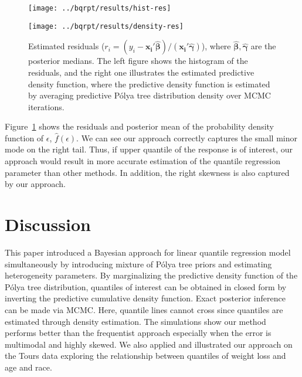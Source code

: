 \documentclass[12pt]{article}
\newcommand{\polya}{P\'{o}lya}
\begin{document}
\begin{figure}[htbp]
  \begin{minipage}{0.5\linewidth}
    \centerline{\texttt{[image: ../bqrpt/results/hist-res]}}
  \end{minipage}
  \begin{minipage}{0.5\linewidth}
    \centerline{\texttt{[image: ../bqrpt/results/density-res]}}
  \end{minipage}
  \caption[]{\label{fig:tourpost} Estimated residuals ($r_i = (y_i-
    \bm{x_i'\hat{\beta}})/(\bm{x_i'\hat{\gamma}})$), where
    $\hat{\bm{\beta}}, \hat{\bm{\gamma}}$ are the posterior
    medians. The left figure shows the histogram of the residuals, and
    the right one illustrates the estimated predictive density
    function, where the predictive density function is estimated by
    averaging predictive \polya{} tree distribution density over MCMC
    iterations.}
\end{figure}

Figure~\ref{fig:tourpost} shows the residuals and posterior mean of
the probability density function of $\epsilon$,
$\hat{f}(\epsilon)$. We can see our approach correctly captures the
small minor mode on the right tail. Thus, if upper quantile of the
response is of interest, our approach would result in more accurate
estimation of the quantile regression parameter than other methods. In
addition, the right skewness is also captured by our approach.

\section{Discussion}
This paper introduced a Bayesian approach for linear quantile
regression model simultaneously by introducing mixture of \polya{}
tree priors and estimating heterogeneity parameters. By marginalizing
the predictive density function of the \polya{} tree distribution,
quantiles of interest can be obtained in closed form by inverting the
predictive cumulative density function. Exact posterior inference can
be made via MCMC. Here, quantile lines cannot cross since quantiles
are estimated through density estimation.  The simulations show our
method performs better than the frequentist approach especially when
the error is multimodal and highly skewed. We also applied and
illustrated our approach on the Tours data exploring the relationship
between quantiles of weight loss and age and race.
\end{document}
